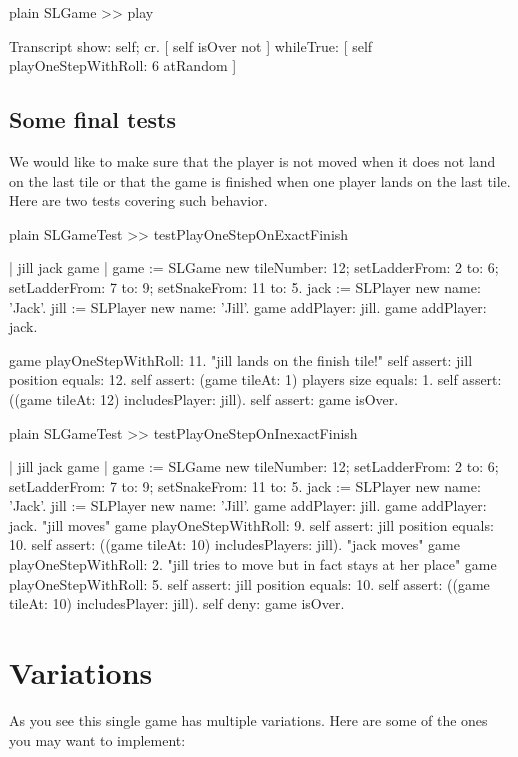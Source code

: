 \documentclass[10pt,twoside,english]{_support/latex/sbabook/sbabook}
\begin{document}
\begin{displaycode}{plain}
SLGame >> play

	Transcript show: self; cr.
	[ self isOver not ] whileTrue: [
		self playOneStepWithRoll: 6 atRandom ] 
\end{displaycode}
\subsection{Some final tests}
We would like to make sure that the player is not moved when it does not land on the last tile or that the game is finished when one player lands on the last tile. Here are two tests covering such behavior.

\begin{displaycode}{plain}
SLGameTest >> testPlayOneStepOnExactFinish
	
	| jill jack game |
	game := SLGame new 
			tileNumber: 12; 
			setLadderFrom: 2 to: 6;
			setLadderFrom: 7 to: 9;
			setSnakeFrom: 11 to: 5.
	jack := SLPlayer new name: 'Jack'.
	jill := SLPlayer new name: 'Jill'.
	game addPlayer: jill. 
	game addPlayer: jack. 

	game playOneStepWithRoll: 11.
	"jill lands on the finish tile!"
	self assert: jill position equals: 12.
	self assert: (game tileAt: 1) players size equals: 1. 
	self assert: ((game tileAt: 12) includesPlayer: jill).
	self assert: game isOver.
\end{displaycode}

\begin{displaycode}{plain}
SLGameTest >> testPlayOneStepOnInexactFinish
	
	| jill jack game |
	game := SLGame new 
			tileNumber: 12; 
			setLadderFrom: 2 to: 6;
			setLadderFrom: 7 to: 9;
			setSnakeFrom: 11 to: 5.
	jack := SLPlayer new name: 'Jack'.
	jill := SLPlayer new name: 'Jill'.
	game addPlayer: jill. 
	game addPlayer: jack. 
    "jill moves"
	game playOneStepWithRoll: 9.
	self assert: jill position equals: 10.
	self assert: ((game tileAt: 10) includesPlayers: jill).
	"jack moves"
	game playOneStepWithRoll: 2. 
	"jill tries to move but in fact stays at her place"
	game playOneStepWithRoll: 5.
	self assert: jill position equals: 10.
	self assert: ((game tileAt: 10) includesPlayer: jill).
	self deny: game isOver.
\end{displaycode}
\section{Variations}
As you see this single game has multiple variations. Here are some of the ones you may want to implement:
\end{document}
